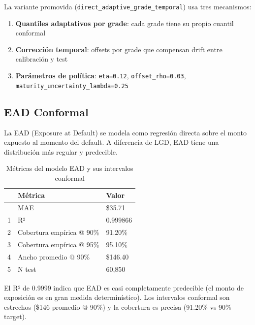 \documentclass[
  spanish,
  11pt,
  letterpaper,
]{scrbook}
\providecommand{\tightlist}{%
  \setlength{\itemsep}{0pt}\setlength{\parskip}{0pt}}
\theoremstyle{plain}
\theoremstyle{remark}
\begin{document}
La variante promovida (\texttt{direct\_adaptive\_grade\_temporal}) usa
tres mecanismos:

\begin{enumerate}
\def\labelenumi{\arabic{enumi}.}
\tightlist
\item
  \textbf{Quantiles adaptativos por grade}: cada grade tiene su propio
  cuantil conformal
\item
  \textbf{Corrección temporal}: offsets por grade que compensan drift
  entre calibración y test
\item
  \textbf{Parámetros de política}: \texttt{eta=0.12},
  \texttt{offset\_rho=0.03}, \texttt{maturity\_uncertainty\_lambda=0.25}
\end{enumerate}

\subsection{EAD Conformal}\label{sec-ead-conformal}

La EAD (Exposure at Default) se modela como regresión directa sobre el
monto expuesto al momento del default. A diferencia de LGD, EAD tiene
una distribución más regular y predecible.

{

\begin{longtable}[]{@{}lll@{}}

\caption{\label{tbl-ead-conformal}Métricas del modelo EAD y sus
intervalos conformal}

\tabularnewline

\toprule\noalign{}
& Métrica & Valor \\
\midrule\noalign{}
\endhead
\bottomrule\noalign{}
\endlastfoot
0 & MAE & \$35.71 \\
1 & R² & 0.999866 \\
2 & Cobertura empírica @ 90\% & 91.20\% \\
3 & Cobertura empírica @ 95\% & 95.10\% \\
4 & Ancho promedio @ 90\% & \$146.40 \\
5 & N test & 60,850 \\

\end{longtable}

}

El R² de 0.9999 indica que EAD es casi completamente predecible (el
monto de exposición es en gran medida determinístico). Los intervalos
conformal son estrechos (\$146 promedio @ 90\%) y la cobertura es
precisa (91.20\% vs 90\% target).
\end{document}
